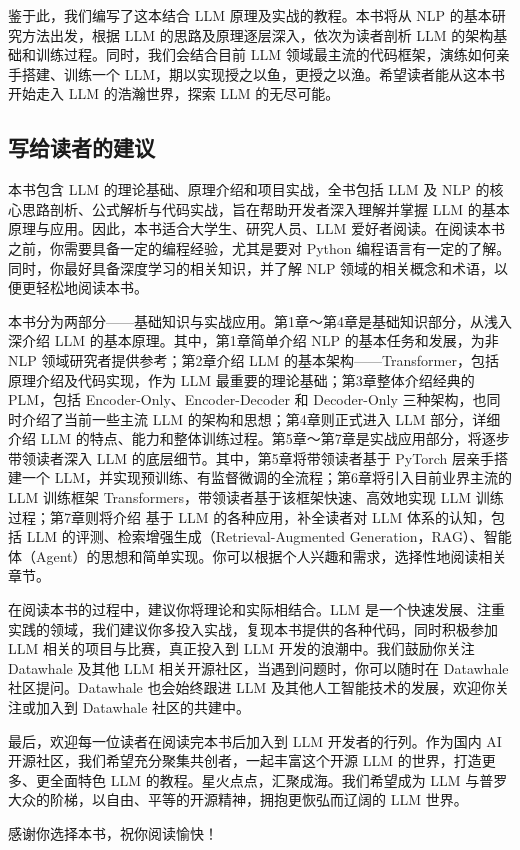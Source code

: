 \documentclass[
]{article}
\begin{document}
鉴于此，我们编写了这本结合 LLM 原理及实战的教程。本书将从 NLP
的基本研究方法出发，根据 LLM 的思路及原理逐层深入，依次为读者剖析 LLM
的架构基础和训练过程。同时，我们会结合目前 LLM
领域最主流的代码框架，演练如何亲手搭建、训练一个
LLM，期以实现授之以鱼，更授之以渔。希望读者能从这本书开始走入 LLM
的浩瀚世界，探索 LLM 的无尽可能。

\subsection{写给读者的建议}\label{ux5199ux7ed9ux8bfbux8005ux7684ux5efaux8bae}

本书包含 LLM 的理论基础、原理介绍和项目实战，全书包括 LLM 及 NLP
的核心思路剖析、公式解析与代码实战，旨在帮助开发者深入理解并掌握 LLM
的基本原理与应用。因此，本书适合大学生、研究人员、LLM
爱好者阅读。在阅读本书之前，你需要具备一定的编程经验，尤其是要对 Python
编程语言有一定的了解。同时，你最好具备深度学习的相关知识，并了解 NLP
领域的相关概念和术语，以便更轻松地阅读本书。

本书分为两部分------基础知识与实战应用。第1章～第4章是基础知识部分，从浅入深介绍
LLM 的基本原理。其中，第1章简单介绍 NLP 的基本任务和发展，为非 NLP
领域研究者提供参考；第2章介绍 LLM
的基本架构------Transformer，包括原理介绍及代码实现，作为 LLM
最重要的理论基础；第3章整体介绍经典的 PLM，包括
Encoder-Only、Encoder-Decoder 和 Decoder-Only
三种架构，也同时介绍了当前一些主流 LLM 的架构和思想；第4章则正式进入 LLM
部分，详细介绍 LLM
的特点、能力和整体训练过程。第5章～第7章是实战应用部分，将逐步带领读者深入
LLM 的底层细节。其中，第5章将带领读者基于 PyTorch 层亲手搭建一个
LLM，并实现预训练、有监督微调的全流程；第6章将引入目前业界主流的 LLM
训练框架 Transformers，带领读者基于该框架快速、高效地实现 LLM
训练过程；第7章则将介绍 基于 LLM 的各种应用，补全读者对 LLM
体系的认知，包括 LLM 的评测、检索增强生成（Retrieval-Augmented
Generation，RAG）、智能体（Agent）的思想和简单实现。你可以根据个人兴趣和需求，选择性地阅读相关章节。

在阅读本书的过程中，建议你将理论和实际相结合。LLM
是一个快速发展、注重实践的领域，我们建议你多投入实战，复现本书提供的各种代码，同时积极参加
LLM 相关的项目与比赛，真正投入到 LLM 开发的浪潮中。我们鼓励你关注
Datawhale 及其他 LLM 相关开源社区，当遇到问题时，你可以随时在 Datawhale
社区提问。Datawhale 也会始终跟进 LLM
及其他人工智能技术的发展，欢迎你关注或加入到 Datawhale 社区的共建中。

最后，欢迎每一位读者在阅读完本书后加入到 LLM 开发者的行列。作为国内 AI
开源社区，我们希望充分聚集共创者，一起丰富这个开源 LLM
的世界，打造更多、更全面特色 LLM
的教程。星火点点，汇聚成海。我们希望成为 LLM
与普罗大众的阶梯，以自由、平等的开源精神，拥抱更恢弘而辽阔的 LLM 世界。

感谢你选择本书，祝你阅读愉快！
\end{document}
